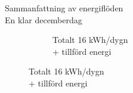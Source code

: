 \begin{frame}{Sammanfattning av energiflöden\\En klar decemberdag}
\begin{figure}
{\begin{subfigure}[b]{0.54\textwidth}
                \caption*{Totalt 16 kWh/dygn \\+ tillförd energi}
        \end{subfigure}
        }
\end{figure}

\end{frame}
